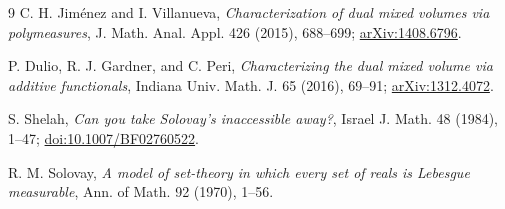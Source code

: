 \documentclass[11pt]{article}
\begin{document}
\begin{thebibliography}{9}
C. H. Jim\'enez and I. Villanueva,
\emph{Characterization of dual mixed volumes via polymeasures},
J. Math. Anal. Appl. 426 (2015), 688--699;
\href{https://arxiv.org/abs/1408.6796}{arXiv:1408.6796}.

P. Dulio, R. J. Gardner, and C. Peri,
\emph{Characterizing the dual mixed volume via additive functionals},
Indiana Univ. Math. J. 65 (2016), 69--91;
\href{https://arxiv.org/abs/1312.4072}{arXiv:1312.4072}.

S. Shelah,
\emph{Can you take Solovay's inaccessible away?},
Israel J. Math. 48 (1984), 1--47;
\href{https://doi.org/10.1007/BF02760522}{doi:10.1007/BF02760522}.

R. M. Solovay,
\emph{A model of set-theory in which every set of reals is Lebesgue
measurable}, Ann. of Math. 92 (1970), 1--56.
\end{thebibliography}
\end{document}

